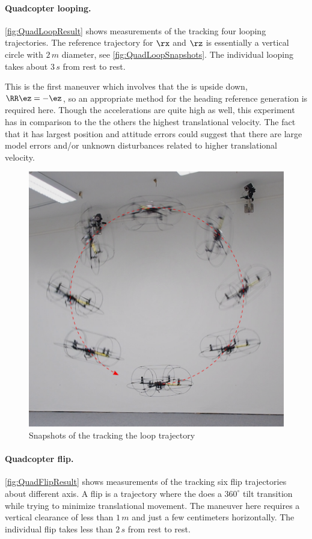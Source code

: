 \paragraph{Quadcopter looping.}
\autoref{fig:QuadLoopResult} shows measurements of the \Quadcopter tracking four looping trajectories.
The reference trajectory for $\rx$ and $\rz$ is essentially a vertical circle with $2\,\unit{m}$ diameter, see \autoref{fig:QuadLoopSnapshots}.
The individual looping takes about $3\,\unit{s}$ from rest to rest.

This is the first maneuver which involves that the \Quadcopter is upside down, \ie $\RR \ez = -\ez$, so an appropriate method for the heading reference generation is required here.
Though the accelerations are quite high as well, this experiment has in comparison to the the others the highest translational velocity.
The fact that it has largest position and attitude errors could suggest that there are large model errors and/or unknown disturbances related to higher translational velocity.

\begin{figure}
 \centering
 \includegraphics[width=.6\linewidth]{graphics/QuadLoopSnapshots.png}
 \caption{Snapshots of the \Quadcopter tracking the loop trajectory}
 \label{fig:QuadLoopSnapshots}
\end{figure}

\paragraph{Quadcopter flip.}
\autoref{fig:QuadFlipResult} shows measurements of the \Quadcopter tracking six flip trajectories about different axis.
A flip is a trajectory where the \Quadcopter does a $360^\circ$ tilt transition while trying to minimize translational movement.
The maneuver here requires a vertical clearance of less than $1\,\unit{m}$ and just a few centimeters horizontally.
The individual flip takes less than $2\,\unit{s}$ from rest to rest.

